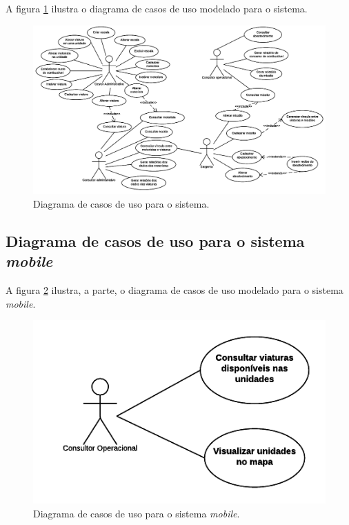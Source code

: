       A figura \ref{diagrama_de_casos_uso} ilustra o diagrama de casos de uso modelado para o sistema.
      
      \begin{figure}[!htbp]
	\centering
	\includegraphics[scale=0.85]{figuras/diagrama_de_casos_uso}
	\caption[Diagrama de casos de uso para o sistema]{Diagrama de casos de uso para o sistema.}
	\label{diagrama_de_casos_uso}
      \end{figure}
    
    \subsection{Diagrama de casos de uso para o sistema \textit{mobile}}
      
      A figura \ref{caso_de_uso_mobile} ilustra, a parte, o diagrama de casos de uso modelado para o sistema \textit{mobile}.
      
      \begin{figure}[!htbp]
	\centering
	\includegraphics[scale=1]{figuras/caso_de_uso_mobile}
	\caption[Diagrama de casos de uso para o sistema \textit{mobile}]{Diagrama de casos de uso para o sistema \textit{mobile}.}
	\label{caso_de_uso_mobile}
      \end{figure}
    
